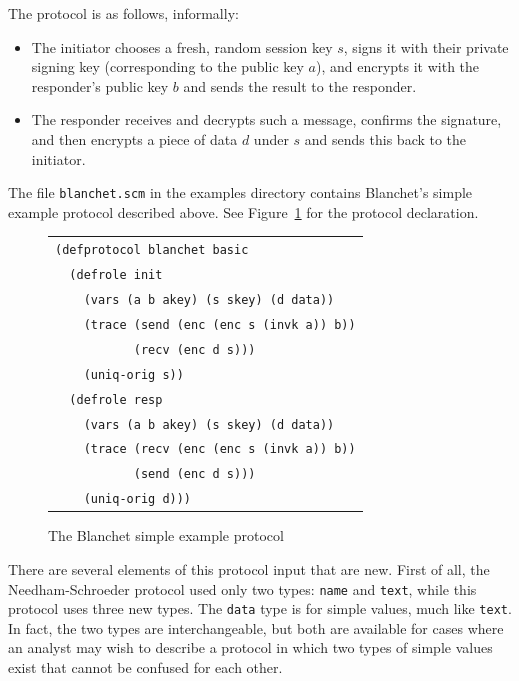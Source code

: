 The protocol is as follows, informally:

\begin{itemize}

\item The initiator chooses a fresh, random session key $s$, signs it
  with their private signing key (corresponding to the public key
  $a$), and encrypts it with the responder's public key $b$ and sends
  the result to the responder.

\item The responder receives and decrypts such a message, confirms the
  signature, and then encrypts a piece of data $d$ under $s$ and sends
  this back to the initiator.
\end{itemize}

The file \texttt{blanchet.scm} in the examples directory contains
Blanchet's simple example protocol described above.  See
Figure~\ref{fig:blanchet defprotocol} for the protocol declaration.

\begin{figure}
\centering
\begin{tabular}{l}
\verb|(defprotocol blanchet basic|\\
\verb|  (defrole init|\\
\verb|    (vars (a b akey) (s skey) (d data))|\\
\verb|    (trace (send (enc (enc s (invk a)) b))|\\
\verb|           (recv (enc d s)))|\\
\verb|    (uniq-orig s))|\\
\verb|  (defrole resp|\\
\verb|    (vars (a b akey) (s skey) (d data))|\\
\verb|    (trace (recv (enc (enc s (invk a)) b))|\\
\verb|           (send (enc d s)))|\\
\verb|    (uniq-orig d)))|
\end{tabular}
\caption{The Blanchet simple example protocol}
\label{fig:blanchet defprotocol}
\end{figure}

   There are several
elements of this protocol input that are new.  First of all, the
Needham-Schroeder protocol used only two types: \texttt{name} and
\texttt{text}, while this protocol uses three new types.  The
\texttt{data} type is for simple values, much like \texttt{text}.  In
fact, the two types are interchangeable, but both are available for
cases where an analyst may wish to describe a protocol in which two
types of simple values exist that cannot be confused for each other.

